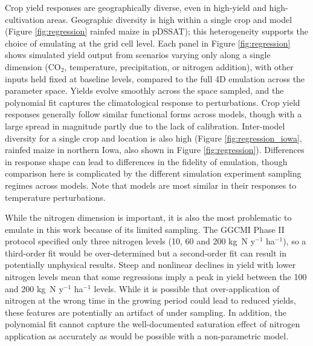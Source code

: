 \documentclass[gmd, manuscript]{copernicus} %
\begin{document}
Crop yield responses are geographically diverse, even in high-yield and high-cultivation areas. Geographic diversity is high  within a single crop and model (Figure \ref{fig:regression} rainfed maize in pDSSAT); this heterogeneity supports the choice of emulating at the grid cell level. Each panel in Figure \ref{fig:regression} shows simulated yield output from scenarios varying only along a single dimension (CO$_2$, temperature, precipitation, or nitrogen addition), with other inputs held fixed at baseline levels, compared to the full 4D emulation across the parameter space. Yields evolve smoothly across the space sampled, and the polynomial fit captures the climatological response to perturbations. Crop yield responses generally follow similar functional forms across models, though with a large spread in magnitude partly due to the lack of calibration. Inter-model diversity for a single crop and location is also high (Figure \ref{fig:regression_iowa}, rainfed maize in northern Iowa, also shown in Figure \ref{fig:regression}). Differences in response shape can lead to  differences in the fidelity of emulation, though comparison here is complicated by the different simulation experiment sampling regimes across models. Note that models are most similar in their responses to temperature perturbations. 

While the nitrogen dimension is important, it is also the most problematic to emulate in this work because of its limited sampling. The GGCMI Phase II protocol specified only three nitrogen levels (10, 60 and 200 kg~N y$^{-1}$ ha$^{-1}$), so a third-order fit would be over-determined but a second-order fit can result in potentially unphysical results. Steep and nonlinear declines in yield with lower nitrogen levels mean that some regressions imply a peak in yield between the 100 and 200 kg~N y$^{-1}$ ha$^{-1}$ levels. While it is possible that over-application of nitrogen at the wrong time in the growing period could lead to reduced yields, these features are potentially an artifact of under sampling. In addition, the polynomial fit cannot capture the well-documented saturation effect of nitrogen application \citep[e.g.][]{Torsten77} as accurately as would be possible with a non-parametric model. 
\end{document}
